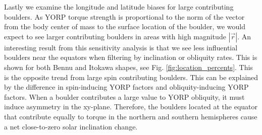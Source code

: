 Lastly we examine the longitude and latitude biases for large contributing boulders. As YORP torque strength is proportional to the norm of the vector from the body center of mass to the surface location of the boulder, we would expect to see larger contributing boulders in areas with high magnitude $|\vec{r}|$. An interesting result from this sensitivity analysis is that we see less influential boulders near the equators when filtering by inclination or obliquity rates. This is shown for both Bennu and Itokawa shapes, see Fig. \ref{fig:location_percents}. This is the opposite trend from large spin contributing boulders. This can be explained by the difference in spin-inducing YORP factors and obliquity-inducing YORP factors. When a boulder contributes a large value to YORP obliquity, it must induce asymmetry in the xy-plane. Therefore, the boulders located at the equator that contribute equally to torque in the northern and southern hemispheres cause a net close-to-zero solar inclination change.

